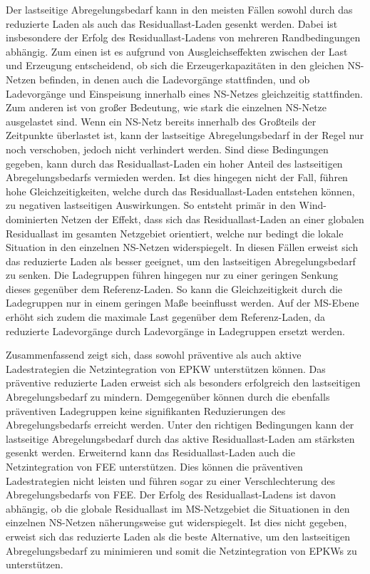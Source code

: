Der lastseitige Abregelungsbedarf kann in den meisten Fällen sowohl durch das reduzierte Laden als auch das Residuallast-Laden gesenkt werden.
Dabei ist insbesondere der Erfolg des Residuallast-Ladens von mehreren Randbedingungen abhängig.
Zum einen ist es aufgrund von Ausgleichseffekten zwischen der Last und Erzeugung entscheidend, ob sich die Erzeugerkapazitäten in den gleichen \gls{NS}-Netzen befinden, in denen auch die Ladevorgänge stattfinden, und ob Ladevorgänge und Einspeisung innerhalb eines \gls{NS}-Netzes gleichzeitig stattfinden.
Zum anderen ist von großer Bedeutung, wie stark die einzelnen \gls{NS}-Netze ausgelastet sind.
Wenn ein \gls{NS}-Netz bereits innerhalb des Großteils der Zeitpunkte überlastet ist, kann der lastseitige Abregelungsbedarf in der Regel nur noch verschoben, jedoch nicht verhindert werden.
Sind diese Bedingungen gegeben, kann durch das Residuallast-Laden ein hoher Anteil des lastseitigen Abregelungsbedarfs vermieden werden.
Ist dies hingegen nicht der Fall, führen hohe Gleichzeitigkeiten, welche durch das Residuallast-Laden entstehen können, zu negativen lastseitigen Auswirkungen.
So entsteht primär in den Wind-dominierten Netzen der Effekt, dass sich das Residuallast-Laden an einer globalen Residuallast im gesamten Netzgebiet orientiert, welche nur bedingt die lokale Situation in den einzelnen \gls{NS}-Netzen widerspiegelt.
In diesen Fällen erweist sich das reduzierte Laden als besser geeignet, um den lastseitigen Abregelungsbedarf zu senken.
Die Ladegruppen führen hingegen nur zu einer geringen Senkung dieses gegenüber dem Referenz-Laden.
So kann die Gleichzeitigkeit durch die Ladegruppen nur in einem geringen Maße beeinflusst werden.
Auf der \gls{MS}-Ebene erhöht sich zudem die maximale Last gegenüber dem Referenz-Laden, da reduzierte Ladevorgänge durch Ladevorgänge in Ladegruppen ersetzt werden.\medskip

Zusammenfassend zeigt sich, dass sowohl präventive als auch aktive Ladestrategien die Netzintegration von \gls{EPKW} unterstützen können.
Das präventive reduzierte Laden erweist sich als besonders erfolgreich den lastseitigen Abregelungsbedarf zu mindern.
Demgegenüber können durch die ebenfalls präventiven Ladegruppen keine signifikanten Reduzierungen des Abregelungsbedarfs erreicht werden.
Unter den richtigen Bedingungen kann der lastseitige Abregelungsbedarf durch das aktive Residuallast-Laden am stärksten gesenkt werden.
Erweiternd kann das Residuallast-Laden auch die Netzintegration von \gls{FEE} unterstützen.
Dies können die präventiven Ladestrategien nicht leisten und führen sogar zu einer Verschlechterung des Abregelungsbedarfs von \gls{FEE}.
Der Erfolg des Residuallast-Ladens ist davon abhängig, ob die globale Residuallast im \gls{MS}-Netzgebiet die Situationen in den einzelnen \gls{NS}-Netzen näherungsweise gut widerspiegelt.
Ist dies nicht gegeben, erweist sich das reduzierte Laden als die beste Alternative, um den lastseitigen Abregelungsbedarf zu minimieren und somit die Netzintegration von \glspl{EPKW} zu unterstützen.\medskip

